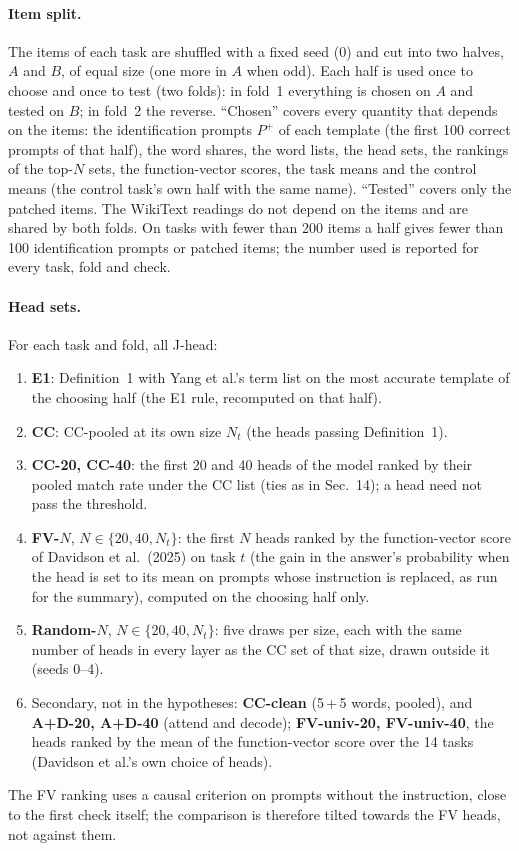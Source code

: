 \paragraph{Item split.} The items of each task are shuffled with a fixed seed (0) and cut into
two halves, $A$ and $B$, of equal size (one more in $A$ when odd). Each half is used once to
choose and once to test (two folds): in fold~1 everything is chosen on $A$ and tested on $B$;
in fold~2 the reverse. ``Chosen'' covers every quantity that depends on the items: the
identification prompts $P^+$ of each template (the first 100 correct prompts of that half),
the word shares, the word lists, the head sets, the rankings of the top-$N$ sets, the
function-vector scores, the task means and the control means (the control task's own half
with the same name). ``Tested'' covers only the patched items. The WikiText readings do not
depend on the items and are shared by both folds. On tasks with fewer than 200 items a half
gives fewer than 100 identification prompts or patched items; the number used is reported for
every task, fold and check.

\paragraph{Head sets.} For each task and fold, all J-head:
\begin{enumerate}
  \item \textbf{E1}: Definition~1 with Yang et al.'s term list on the most accurate template
    of the choosing half (the E1 rule, recomputed on that half).
  \item \textbf{CC}: CC-pooled at its own size $N_t$ (the heads passing Definition~1).
  \item \textbf{CC-20, CC-40}: the first 20 and 40 heads of the model ranked by their pooled
    match rate under the CC list (ties as in Sec.~14); a head need not pass the threshold.
  \item \textbf{FV-$N$}, $N \in \{20, 40, N_t\}$: the first $N$ heads ranked by the
    function-vector score of Davidson et al.\ (2025) on task $t$ (the gain in the answer's
    probability when the head is set to its mean on prompts whose instruction is replaced, as
    run for the summary), computed on the choosing half only.
  \item \textbf{Random-$N$}, $N \in \{20, 40, N_t\}$: five draws per size, each with the same
    number of heads in every layer as the CC set of that size, drawn outside it (seeds 0--4).
  \item Secondary, not in the hypotheses: \textbf{CC-clean} (5\,+\,5 words, pooled), and
    \textbf{A+D-20, A+D-40} (attend and decode); \textbf{FV-univ-20, FV-univ-40}, the heads
    ranked by the mean of the function-vector score over the 14 tasks (Davidson et al.'s own
    choice of heads).
\end{enumerate}
The FV ranking uses a causal criterion on prompts without the instruction, close to the first
check itself; the comparison is therefore tilted towards the FV heads, not against them.


